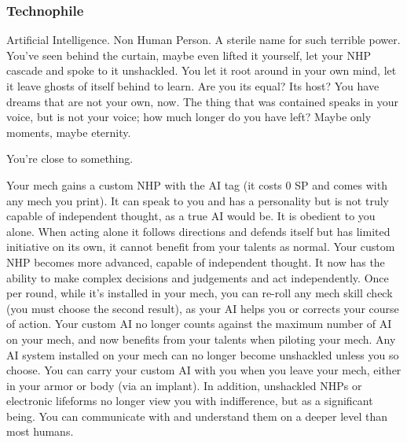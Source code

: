\subsubsection{Technophile}

\begin{talent}
{Artificial Intelligence. Non Human Person. A sterile name for such terrible power. You've seen behind the curtain, maybe even lifted it yourself, let your NHP cascade and spoke to it unshackled. You let it root around in your own mind, let it leave ghosts of itself behind to learn. Are you its equal? Its host? You have dreams that are not your own, now. The thing that was contained speaks in your voice, but is not your voice; how much longer do you have left? Maybe only moments, maybe eternity.

You're close to something.}

Your mech gains a custom NHP with the AI tag (it costs 0 SP and comes with any mech you print). It can speak to you and has a personality but is not truly capable of independent thought, as a true AI would be. It is obedient to you alone. When acting alone it follows directions and defends itself but has limited initiative on its own, it cannot benefit from your talents as normal. 
Your custom NHP becomes more advanced, capable of independent thought. It now has the ability to make complex decisions and judgements and act independently. Once per round, while it's installed in your mech, you can re-roll any mech skill check (you must choose the second result), as your AI helps you or corrects your course of action. 
Your custom AI no longer counts against the maximum number of AI on your mech, and now benefits from your talents when piloting your mech. Any AI system installed on your mech can no longer become unshackled unless you so choose. You can carry your custom AI with you when you leave your mech, either in your armor or body (via an implant). In addition, unshackled NHPs or electronic lifeforms no longer view you with indifference, but as a significant being. You can communicate with and understand them on a deeper level than most humans.
\end{talent}